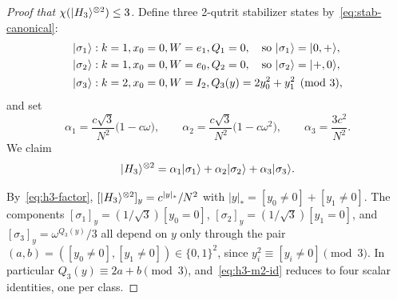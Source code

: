 \documentclass[11pt]{article}
\theoremstyle{definition}
\newcommand{\microspace}{\mspace{0.5mu}}
\newcommand{\ket}[1]{\lvert\microspace #1 \microspace \rangle}
\newcommand{\chiR}{\chi}
\newcommand{\Hth}{\ket{H_3}}
\begin{document}
	\begin{proof}[Proof that $\chiR(\Hth^{\otimes 2}) \le 3$]
		Define three 2-qutrit stabilizer states by~\eqref{eq:stab-canonical}:
		\begin{equation}\label{eq:h3-m2-states}
			\begin{aligned}
				\ket{\sigma_1} &: k = 1, x_0 = 0, W = e_1, Q_1 = 0,
				\quad \text{so } \ket{\sigma_1} = \ket{0, +}, \\
				\ket{\sigma_2} &: k = 1, x_0 = 0, W = e_0, Q_2 = 0,
				\quad \text{so } \ket{\sigma_2} = \ket{+, 0}, \\
				\ket{\sigma_3} &: k = 2, x_0 = 0, W = I_2, 
				Q_3(y) = 2 y_0^2 + y_1^2 \pmod 3,
			\end{aligned}
		\end{equation}
		and set
		\begin{equation}\label{eq:h3-m2-coeffs}
			\alpha_1 = \frac{c \sqrt 3}{N^2}\big( 1 - c \omega \big), \qquad
			\alpha_2 = \frac{c \sqrt 3}{N^2}\big( 1 - c \omega^2 \big), \qquad
			\alpha_3 = \frac{3 c^2}{N^2}.
		\end{equation}
		We claim
		\begin{equation}\label{eq:h3-m2-id}
			\Hth^{\otimes 2}
			= \alpha_1 \ket{\sigma_1} + \alpha_2 \ket{\sigma_2} + \alpha_3 \ket{\sigma_3}.
		\end{equation}
		
		By~\eqref{eq:h3-factor}, $[\Hth^{\otimes 2}]_y = c^{|y|_*}/N^2$ with
		$|y|_* = [y_0 \neq 0] + [y_1 \neq 0]$. The components
		$[\sigma_1]_y = (1/\sqrt 3)[y_0 = 0]$,
		$[\sigma_2]_y = (1/\sqrt 3)[y_1 = 0]$, and
		$[\sigma_3]_y = \omega^{Q_3(y)}/3$ all depend on $y$ only through the pair
		$(a, b) = ([y_0 \ne 0], [y_1 \ne 0]) \in \{0, 1\}^2$, since
		$y_i^2 \equiv [y_i \ne 0] \pmod 3$. In particular $Q_3(y) \equiv 2a + b
		\pmod 3$, and~\eqref{eq:h3-m2-id} reduces to four scalar identities,
		one per class.
		

\end{proof}
\end{document}
